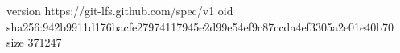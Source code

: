 version https://git-lfs.github.com/spec/v1
oid sha256:942b9911d176bacfe27974117945e2d99e54ef9c87ccda4ef3305a2e01e40b70
size 371247
